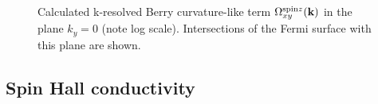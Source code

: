 \begin{figure}[htb!]
	\centering
	\qquad
	\caption{Calculated k-resolved Berry curvature-like term $\Omega_{xy}^{\text{spin}z}(\bfk)$ in the plane $k_y=0$ (note log scale). Intersections of the Fermi surface
		with this plane are shown.}
	\label{fig29.2}
\end{figure}

\subsection*{Spin Hall conductivity}

